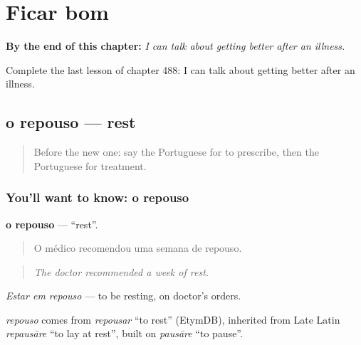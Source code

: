 
\chapter{Ficar bom}
\label{ch:pt-ficar-bom}

\begin{chapteropening}
\textbf{By the end of this chapter:} \emph{I can talk about getting better after an illness.}

Complete the last lesson of chapter 488: I can talk about getting better after an illness.
\end{chapteropening}

\section[o repouso]{o repouso — rest}

\label{lesson:PT-C488-repouso}



\begin{quote}
Before the new one: say the Portuguese for to prescribe, then the Portuguese for treatment.
\end{quote}

\subsection*{You'll want to know: o repouso}
\textbf{o repouso} — \textquotedblleft{}rest\textquotedblright{}.

\begin{quote}
O médico recomendou uma semana de repouso.
\end{quote}

\begin{quote}
\emph{The doctor recommended a week of rest.}
\end{quote}

\emph{Estar em repouso} — to be resting, on doctor's orders.

\begin{cousinweb}
\emph{repouso} comes from \emph{repousar} \textquotedblleft{}to rest\textquotedblright{} (EtymDB), inherited from Late Latin \emph{repausāre} \textquotedblleft{}to lay at rest\textquotedblright{}, built on \emph{pausāre} \textquotedblleft{}to pause\textquotedblright{}.
\end{cousinweb}

